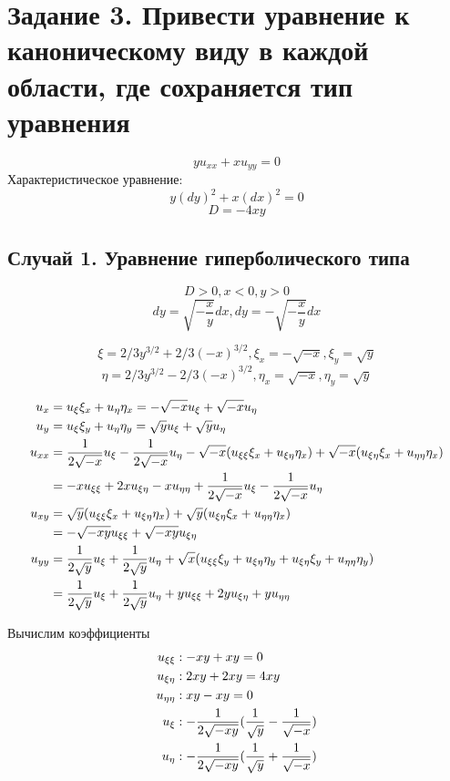 \documentclass[a4paper,12pt]{article}
\begin{document}
\section{Задание 3. Привести уравнение к каноническому виду в каждой области, где сохраняется тип уравнения}
$$yu_{xx} + xu_{yy} = 0$$
Характеристическое уравнение:
$$y(dy)^2 + x(dx)^2 = 0$$
$$D = -4xy$$

\subsection{Случай 1. Уравнение гиперболического типа}
$$D > 0, x < 0, y > 0$$
$$dy = \sqrt{-\frac{x}{y}}dx,
dy = -\sqrt{-\frac{x}{y}}dx$$

$$\xi = 2/3y^{3/2} + 2/3(-x)^{3/2}, \xi_x = -\sqrt{-x}, \xi_y = \sqrt{y}$$
$$\eta = 2/3y^{3/2} - 2/3(-x)^{3/2}, \eta_x = \sqrt{-x}, \eta_y = \sqrt{y}$$

\begin{align}
u_x &= u_\xi\xi_x + u_\eta\eta_x = -\sqrt{-x}u_\xi + \sqrt{-x}u_\eta \notag \\ \notag
u_y &= u_\xi\xi_y + u_\eta\eta_y = \sqrt{y}u_\xi + \sqrt{y}u_\eta \\ \notag
u_{xx} &= \frac{1}{2\sqrt{-x}}u_\xi - \frac{1}{2\sqrt{-x}}u_\eta 
- \sqrt{-x}(u_{\xi\xi}\xi_x + u_{\xi\eta}\eta_x)
+ \sqrt{-x}(u_{\xi\eta}\xi_x + u_{\eta\eta}\eta_x) \\ \notag
&= -xu_{\xi\xi} + 2xu_{\xi\eta} - xu_{\eta\eta} + \frac{1}{2\sqrt{-x}}u_\xi - \frac{1}{2\sqrt{-x}}u_\eta \\ \notag
u_{xy} &= \sqrt{y}(u_{\xi\xi}\xi_x + u_{\xi\eta}\eta_x) + \sqrt{y}(u_{\xi\eta}\xi_x + u_{\eta\eta}\eta_x)  \\ \notag
&= -\sqrt{-xy}u_{\xi\xi} + \sqrt{-xy}u_{\xi\eta} \\ \notag
u_{yy} &= \frac{1}{2\sqrt{y}}u_\xi + \frac{1}{2\sqrt{y}}u_\eta + \sqrt{x}(u_{\xi\xi}\xi_y + u_{\xi\eta}\eta_y + u_{\xi\eta}\xi_y + u_{\eta\eta}\eta_y) \\ \notag
&= \frac{1}{2\sqrt{y}}u_\xi + \frac{1}{2\sqrt{y}}u_\eta + yu_{\xi\xi} + 2yu_{\xi\eta} + yu_{\eta\eta} \notag
\end{align}

Вычислим коэффициенты
\begin{align}
u_{\xi\xi} &: -xy + xy = 0 \notag \\ \notag
u_{\xi\eta} &: 2xy + 2xy = 4xy \\ \notag
u_{\eta\eta} &: xy - xy = 0 \\ \notag
u_\xi &: -\frac{1}{2\sqrt{-xy}}(\frac{1}{\sqrt{y}} - \frac{1}{\sqrt{-x}}) \\ \notag
u_\eta &: -\frac{1}{2\sqrt{-xy}}(\frac{1}{\sqrt{y}} + \frac{1}{\sqrt{-x}}) \\ \notag
\end{align}
\end{document}
